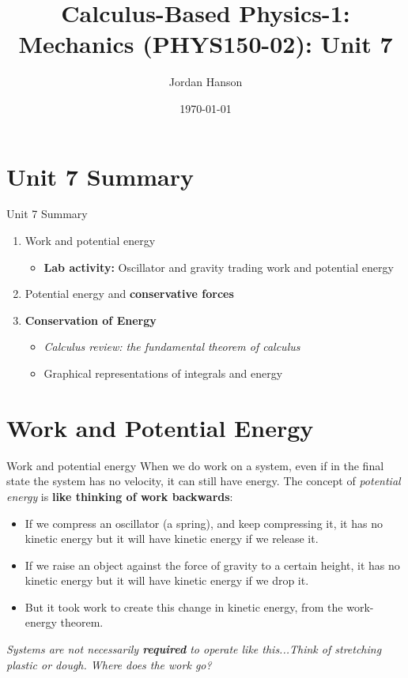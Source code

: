 \documentclass{beamer}
\title{Calculus-Based Physics-1: Mechanics (PHYS150-02): Unit 7}
\date{\today}
\author{Jordan Hanson}
\institute{Whittier College Department of Physics and Astronomy}
\begin{document}
\maketitle

\section{Unit 7 Summary}

\begin{frame}{Unit 7 Summary}
\begin{enumerate}
\item \alert{Work} and \alert{potential energy}
\begin{itemize}
\item \textbf{Lab activity:} Oscillator and gravity trading work and potential energy
\end{itemize}
\item Potential energy and \textbf{conservative forces}
\item \alert{\textbf{Conservation of Energy}}
\begin{itemize}
\item \textit{Calculus review: the fundamental theorem of calculus}
\item Graphical representations of integrals and energy
\end{itemize}
\end{enumerate}
\end{frame}

\section{Work and Potential Energy}

\begin{frame}{Work and potential energy}
When we do work on a system, even if in the final state the system has no velocity, it can still have energy.  The concept of \textit{potential energy} is \textbf{like thinking of work backwards}:
\begin{itemize}
\item If we compress an oscillator (a spring), and keep compressing it, it has no kinetic energy but it will have kinetic energy if we release it.
\item If we raise an object against the force of gravity to a certain height, it has no kinetic energy but it will have kinetic energy if we drop it.
\item \alert{But it took work to create this change in kinetic energy, from the work-energy theorem.} 
\end{itemize}
\textit{Systems are not necessarily \textbf{required} to operate like this...Think of stretching plastic or dough.  Where does the work go?}
\end{frame}
\end{document}
